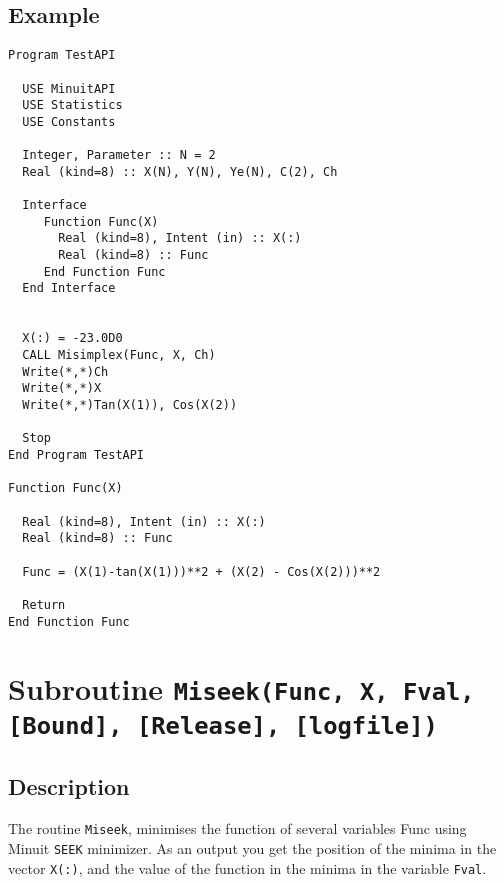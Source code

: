 \subsection{Example}

\begin{lstlisting}[emph=Minimize,
                   emphstyle=\color{blue},
                   frame=trBL,
                   caption=Using minuit library to minimize a function.,
                   label=minimize]
Program TestAPI

  USE MinuitAPI
  USE Statistics
  USE Constants

  Integer, Parameter :: N = 2
  Real (kind=8) :: X(N), Y(N), Ye(N), C(2), Ch

  Interface 
     Function Func(X)
       Real (kind=8), Intent (in) :: X(:)
       Real (kind=8) :: Func
     End Function Func
  End Interface
  

  X(:) = -23.0D0
  CALL Misimplex(Func, X, Ch)
  Write(*,*)Ch
  Write(*,*)X
  Write(*,*)Tan(X(1)), Cos(X(2))

  Stop
End Program TestAPI

Function Func(X)

  Real (kind=8), Intent (in) :: X(:)
  Real (kind=8) :: Func

  Func = (X(1)-tan(X(1)))**2 + (X(2) - Cos(X(2)))**2

  Return
End Function Func
\end{lstlisting}

\section{Subroutine \texttt{Miseek(Func, X, Fval, [Bound], [Release], [logfile]) }}

\subsection{Description}

The routine \texttt{Miseek}, minimises the function of several
variables Func using Minuit \texttt{SEEK} minimizer. As an output
you get the position of the minima in the 
vector \texttt{X(:)}, and the value of the function in the minima in
the variable \texttt{Fval}. 

